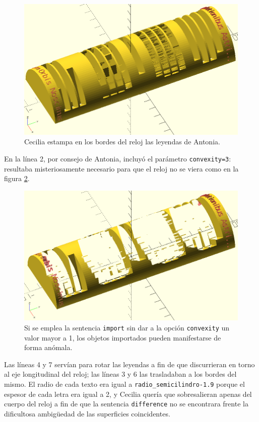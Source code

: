 \begin{figure}[ht]
  \centering
  \includegraphics[width=.9\textwidth]{imagenes/reloj-de-sol-con-leyendas-1}  
  \caption{Cecilia estampa en los bordes del reloj las leyendas de
    Antonia.}
  \label{fig:reloj-de-sol-con-leyendas-1}
\end{figure}


En la línea 2, por consejo de Antonia, incluyó el parámetro
\lstinline!convexity=3!: resultaba misteriosamente necesario para que
el reloj no se viera como en la figura \ref{fig:import-sin-convexity}.


\begin{figure}[ht]
  \centering
  \includegraphics[width=.8\textwidth]{imagenes/import-sin-convexity} 
  \caption{Si se emplea la sentencia \lstinline!import! sin dar a la
    opción \texttt{convexity} un valor mayor a 1, los objetos
    importados pueden manifestarse de forma anómala.}
  \label{fig:import-sin-convexity}
\end{figure}


Las líneas 4 y 7 servían para rotar las leyendas a fin de que
discurrieran en torno al eje longitudinal del reloj; las líneas 3 y 6
las trasladaban a los bordes del mismo. El radio de cada texto era
igual a \lstinline!radio_semicilindro-1.9! porque el espesor de cada
letra era igual a 2, y Cecilia quería que sobresalieran apenas del
cuerpo del reloj a fin de que la sentencia \lstinline!difference! no
se encontrara frente la dificultosa ambigüedad de las superficies
coincidentes.

